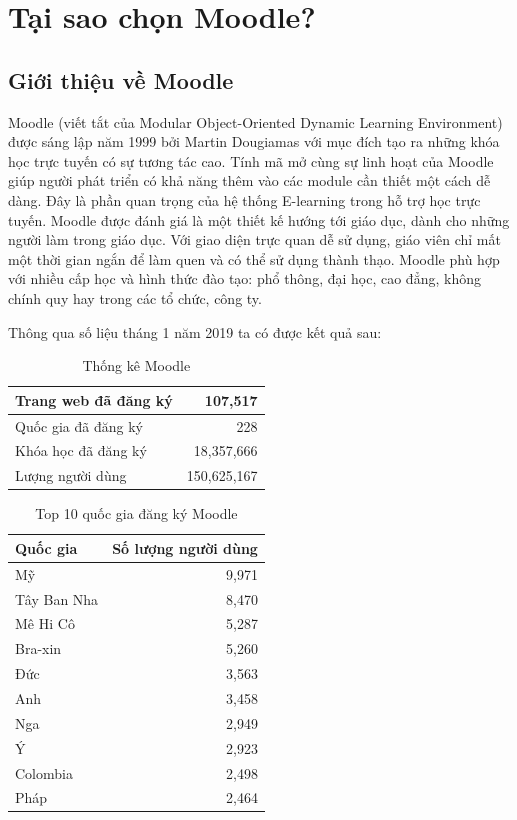 \section{Tại sao chọn Moodle?}
\subsection{Giới thiệu về Moodle \cite{aboutmoodle}}
{Moodle (viết tắt của Modular Object-Oriented Dynamic Learning Environment) được sáng lập năm 1999 bởi Martin Dougiamas với mục đích tạo ra những khóa học trực tuyến có sự tương tác cao. Tính mã mở cùng sự linh hoạt của Moodle giúp người phát triển có khả năng thêm vào các module cần thiết một cách dễ dàng. Đây là phần quan trọng của hệ thống E-learning trong hỗ trợ học trực tuyến. Moodle được đánh giá là một thiết kế hướng tới giáo dục, dành cho những người làm trong giáo dục. Với giao diện trực quan dễ sử dụng, giáo viên chỉ mất một thời gian ngắn để làm quen và có thể sử dụng thành thạo. Moodle phù hợp với nhiều cấp học và hình thức đào tạo: phổ thông, đại học, cao đẳng, không chính quy hay trong các tổ chức, công ty.}


{Thông qua số liệu tháng 1 năm 2019 \cite{moodlestats} ta có được kết quả sau:}
\begin{center}
	\begin{table}[!htp]
		\centering
		\begin{tabular}{|l|r|}
			\hline 
			Trang web đã đăng ký & 107,517 \\ 
			\hline 
			Quốc gia đã đăng ký & 228 \\ 
			\hline 
			Khóa học đã đăng ký & 18,357,666 \\ 
			\hline 
			Lượng người dùng & 150,625,167 \\ 
			\hline 
		\end{tabular} 
		\caption{Thống kê Moodle}
		\label{bang1}
	\end{table}
\end{center}
\begin{center}
	\begin{table}[!htp]
		\centering
		\begin{tabular}{|l|r|}
			\hline 
			{\bf Quốc gia} & {\bf Số lượng người dùng} \\ 
			\hline 
			Mỹ & 9,971 \\ 
			\hline 
			Tây Ban Nha & 8,470 \\ 
			\hline 
			Mê Hi Cô & 5,287 \\ 
			\hline 
			Bra-xin & 5,260 \\ 
			\hline 
			Đức & 3,563 \\ 
			\hline 
			Anh & 3,458 \\ 
			\hline 
			Nga & 2,949 \\ 
			\hline 
			Ý & 2,923 \\ 
			\hline 
			Colombia & 2,498 \\ 
			\hline 
			Pháp & 2,464 \\ 
			\hline 
		\end{tabular} 
		\caption{Top 10 quốc gia đăng ký Moodle}
		\label{bang3}
	\end{table}
\end{center}

